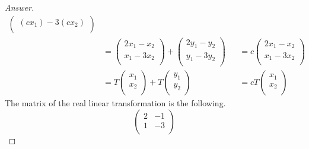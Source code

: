 \documentclass[../psets.tex]{subfiles}
\begin{document}
\begin{enumerate}[label={\textbf{3.\arabic*.}}]
\begin{enumerate}
\begin{proof}[Answer]
\begin{align*}
\begin{pmatrix}
                        (cx_1)-3(cx_2)\\
                    \end{pmatrix}\\
                &=
                \begin{pmatrix}
                    2x_1-x_2\\
                    x_1-3x_2\\
                \end{pmatrix}
                +
                \begin{pmatrix}
                    2y_1-y_2\\
                    y_1-3y_2\\
                \end{pmatrix}&
                    &= c
                    \begin{pmatrix}
                        2x_1-x_2\\
                        x_1-3x_2\\
                    \end{pmatrix}\\
                &= T
                \begin{pmatrix}
                    x_1\\
                    x_2\\
                \end{pmatrix}
                +T
                \begin{pmatrix}
                    y_1\\
                    y_2\\
                \end{pmatrix}&
                    &= cT
                    \begin{pmatrix}
                        x_1\\
                        x_2\\
                    \end{pmatrix}
            \end{align*}
            The matrix of the real linear transformation is the following.
            \begin{equation*}
                \begin{pmatrix}
                    2 & -1\\
                    1 & -3\\
                \end{pmatrix}
            \end{equation*}
        \end{proof}
    \end{enumerate}
\end{enumerate}
\end{document}
